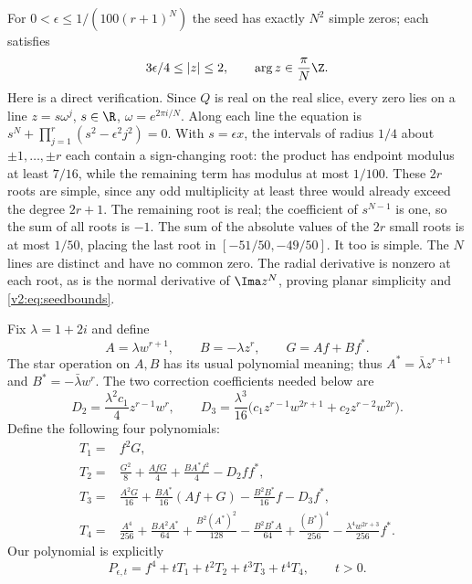\documentclass[UTF8,11pt]{ctexart}
\theoremstyle{definition}
\numberwithin{equation}{section}
\begin{document}
For $0<\epsilon\le1/(100(r+1)^N)$ the seed has exactly $N^2$
simple zeros; each satisfies
\begin{equation}\label{v2:eq:seedbounds}
 3\epsilon/4\le |z|\le2,\qquad
 \arg z\in\frac{\pi}{N}\Z.
\end{equation}
Here is a direct verification. Since $Q$ is real on the real slice,
every zero lies on a line $z=s\omega^j$, $s\in\R$,
$\omega=e^{2\pi i/N}$. Along each line the equation is
$s^N+\prod_{j=1}^r(s^2-\epsilon^2j^2)=0$.
With $s=\epsilon x$, the intervals of radius $1/4$ about
$\pm1,\ldots,\pm r$ each contain a sign-changing root: the product
has endpoint modulus at least $7/16$, while the remaining term
has modulus at most $1/100$. These $2r$ roots are simple, since any
odd multiplicity at least three would already exceed the degree $2r+1$.
The remaining root is real; the coefficient of $s^{N-1}$ is one,
so the sum of all roots is $-1$. The sum of the absolute values of
the $2r$ small roots is at most $1/50$, placing the last root in
$[-51/50,-49/50]$. It too is simple. The $N$ lines are distinct and
have no common zero. The radial derivative is nonzero at each root,
as is the normal derivative of $\Ima z^N$, proving planar simplicity
and \eqref{v2:eq:seedbounds}.

Fix $\lambda=1+2i$ and define
\begin{equation}\label{v2:eq:ABG}
 A=\lambda w^{r+1},\qquad B=-\lambda z^r,\qquad G=Af+Bf^*.
\end{equation}
The star operation on $A,B$ has its usual polynomial meaning; thus
$A^*=\bar\lambda z^{r+1}$ and $B^*=-\bar\lambda w^r$.
The two correction coefficients needed below are
\begin{equation}\label{v2:eq:errors}
 D_2=\frac{\lambda^2c_1}{4}z^{r-1}w^r,\qquad
 D_3=\frac{\lambda^3}{16}
       \bigl(c_1z^{r-1}w^{2r+1}+c_2z^{r-2}w^{2r}\bigr).
\end{equation}
Define the following four polynomials:
\begin{align}
 T_1={}&f^2G,\label{v2:eq:T1}\\
 T_2={}&\frac{G^2}{8}+\frac{AfG}{4}
             +\frac{BA^*f^2}{4}-D_2ff^*,\label{v2:eq:T2}\\
 T_3={}&\frac{A^2G}{16}+\frac{BA^*}{16}(Af+G)
             -\frac{B^2B^*}{16}f-D_3f^*,\label{v2:eq:T3}\\
 T_4={}&\frac{A^4}{256}+\frac{BA^2A^*}{64}
             +\frac{B^2(A^*)^2}{128}-\frac{B^2B^*A}{64}
             +\frac{(B^*)^4}{256}
             -\frac{\lambda^4w^{2r+3}}{256}f^*.
             \label{v2:eq:T4}
\end{align}
Our polynomial is explicitly
\begin{equation}\label{v2:eq:family}
 P_{\epsilon,t}=f^4+tT_1+t^2T_2+t^3T_3+t^4T_4,
 \qquad t>0.
\end{equation}
\end{document}
